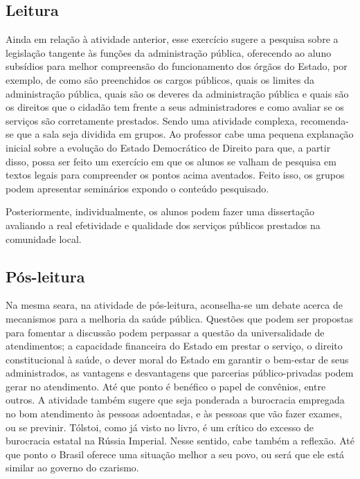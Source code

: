 \documentclass{extarticle}
\begin{document}
\subsection{Leitura}

Ainda em relação à atividade anterior, esse exercício sugere
a pesquisa sobre a legislação tangente às funções da administração
pública, oferecendo ao aluno subsídios para melhor compreensão do
funcionamento dos órgãos do Estado, por exemplo, de como são preenchidos
os cargos públicos, quais os limites da administração pública, quais são
os deveres da administração pública e quais são os direitos que o
cidadão tem frente a seus administradores e como avaliar se os serviços
são corretamente prestados. Sendo uma atividade complexa, recomenda-se
que a sala seja dividida em grupos. Ao professor cabe uma pequena
explanação inicial sobre a evolução do Estado Democrático de Direito
para que, a partir disso, possa ser feito um exercício em que os alunos
se valham de pesquisa em textos legais para compreender os pontos acima
aventados. Feito isso, os grupos podem apresentar seminários expondo o
conteúdo pesquisado.

Posteriormente, individualmente, os alunos podem fazer uma dissertação
avaliando a real efetividade e qualidade dos serviços públicos prestados
na comunidade local.

\subsection{Pós-leitura}

Na mesma seara, na atividade de pós-leitura, aconselha-se um
debate acerca de mecanismos para a melhoria da saúde pública. Questões
que podem ser propostas para fomentar a discussão podem perpassar a
questão da universalidade de atendimentos; a capacidade financeira do
Estado em prestar o serviço, o direito constitucional à saúde, o dever
moral do Estado em garantir o bem-estar de seus administrados, as
vantagens e desvantagens que parcerias público-privadas podem gerar no
atendimento. Até que ponto é benéfico o papel de convênios, entre
outros. A atividade também sugere que seja ponderada a burocracia
empregada no bom atendimento às pessoas adoentadas, e às pessoas que vão
fazer exames, ou se previnir. Tólstoi, como já visto no livro, é um
crítico do excesso de burocracia estatal na Rússia Imperial. Nesse
sentido, cabe também a reflexão. Até que ponto o Brasil oferece uma
situação melhor a seu povo, ou será que ele está similar ao governo do
czarismo.
\end{document}
